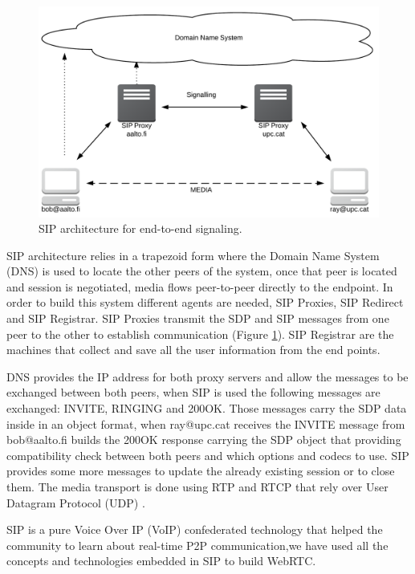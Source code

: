 \begin{figure}[h]
  \centering
    \includegraphics[width=1\textwidth]{./figures/SIParchitecture.png}
      \caption[SIP architecture for end-to-end signaling]{SIP architecture for end-to-end signaling.}
	\label{fig:SIParchitecture}
\end{figure}

SIP architecture relies in a trapezoid form where the Domain Name System (DNS) is used to locate the other peers of the system, once that peer is located and session is negotiated, media flows peer-to-peer directly to the endpoint. In order to build this system different agents are needed, SIP Proxies, SIP Redirect and SIP Registrar. SIP Proxies transmit the SDP and SIP messages from one peer to the other to establish communication (Figure \ref{fig:SIParchitecture}). SIP Registrar are the machines that collect and save all the user information from the end points.

DNS provides the IP address for both proxy servers and allow the messages to be exchanged between both peers, when SIP is used the following messages are exchanged: INVITE, RINGING and 200OK. Those messages carry the SDP data inside in an object format, when ray@upc.cat receives the INVITE message from bob@aalto.fi builds the 200OK response carrying the SDP object that providing compatibility check between both peers and which options and codecs to use. SIP provides some more messages to update the already existing session or to close them. The media transport is done using RTP and RTCP that rely over User Datagram Protocol (UDP) \cite{sipRFC}.

SIP is a pure Voice Over IP (VoIP) confederated technology that helped the community to learn about real-time P2P communication,we have used all the concepts and technologies embedded in SIP to build WebRTC.

